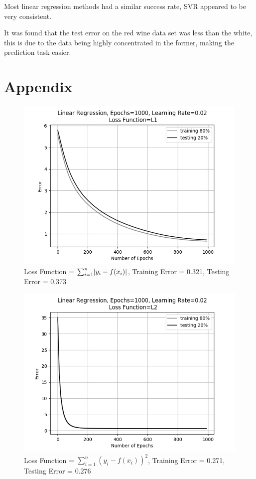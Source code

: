 \documentclass[10pt,twocolumn,letterpaper]{article}
\DeclarePairedDelimiter\abs{\lvert}{\rvert}%
\begin{document}
Most linear regression methods had a similar success rate, SVR appeared to be very consistent.

It was found that the test error on the red wine data set was less than the white, this is due to the data being highly concentrated in the former, making the prediction task easier.




\section{Appendix}

\begin{figure}[h]
	\begin{center}
		\includegraphics[width=0.9\linewidth]{img/l1loss.png}
	\end{center}
	\caption{Loss Function = $\sum_{i = 1}^{n} \abs{y_i - f(x_i)}$, Training Error = 0.321, Testing Error = 0.373}
	\label{fig:l1loss}
\end{figure}

\begin{figure}[h]
	\begin{center}
		\includegraphics[width=0.9\linewidth]{img/l2loss.png}
	\end{center}
	\caption{Loss Function = $\sum_{i = 1}^{n} (y_i - f(x_i))^2$, Training Error = 0.271, Testing Error = 0.276}
	\label{fig:l2loss}
\end{figure}

{\small


}
\end{document}
